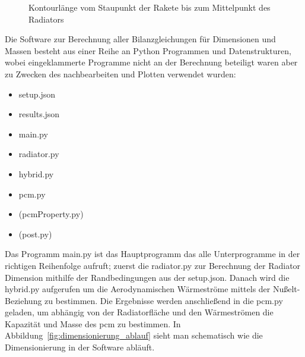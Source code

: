 \begin{figure}[H]
  \centering
  \caption{Kontourlänge vom Staupunkt der Rakete bis zum Mittelpunkt des Radiators}\label{fig:rakete_kontour_zeichnung}
\end{figure}


Die Software zur Berechnung aller Bilanzgleichungen für Dimensionen und Massen besteht aus einer Reihe an Python Programmen und Datenstrukturen, wobei
eingeklammerte Programme nicht an der Berechnung beteiligt waren aber zu Zwecken des nachbearbeiten und Plotten verwendet wurden:
\begin{itemize}
  \item setup.json
  \item results.json
  \item main.py
  \item radiator.py
  \item hybrid.py
  \item pcm.py
  \item (pcmProperty.py)
  \item (post.py)
\end{itemize}
Das Programm main.py ist das Hauptprogramm das alle Unterprogramme in der richtigen Reihenfolge aufruft; zuerst die radiator.py zur Berechnung
der Radiator Dimension mithilfe der Randbedingungen aus der setup.json. Danach wird die hybrid.py aufgerufen um die Aerodynamischen Wärmeströme
mittels der Nußelt-Beziehung zu bestimmen. Die Ergebnisse werden anschließend in die pcm.py geladen, um abhängig von der Radiatorfläche
und den Wärmeströmen die Kapazität und Masse des \ac{pcm} zu bestimmen.
In Abbildung~\ref{fig:dimensionierung_ablauf} sieht man schematisch wie die Dimensionierung in der Software abläuft.

